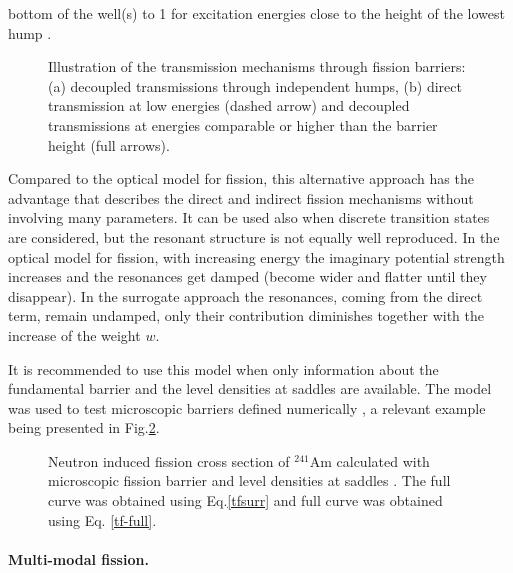 bottom of the well(s) to 1 for excitation energies close to the height of
the lowest hump \cite{Sin:07}. 
\begin{figure}[htbp]
\caption{Illustration of the transmission mechanisms through fission
barriers: (a) decoupled transmissions through independent humps, (b) direct
transmission at low energies (dashed arrow) and decoupled transmissions at
energies comparable or higher than the barrier height (full arrows).}
\label{fis-ld0.eps}
\end{figure}
Compared to the optical model for fission, this alternative approach has the
advantage that describes the direct and indirect fission mechanisms without
involving many parameters. It can be used also when discrete transition
states are considered, but the resonant structure is not equally well
reproduced. In the optical model for fission, with increasing energy the
imaginary potential strength increases and the resonances get damped (become
wider and flatter until they disappear). In the surrogate approach the
resonances, coming from the direct term, remain undamped, only their
contribution diminishes together with the increase of the weight $w$.

It is recommended to use this model when only information about the
fundamental barrier and the level densities at saddles are available. The
model was used to test microscopic barriers defined numerically \cite{Sin:07}%
, a relevant example being presented in Fig.\ref{am41-surr}. 
\begin{figure}[htbp]
\caption{Neutron induced fission cross section of $^{241}$Am calculated with
microscopic fission barrier \protect\cite{Goriely:07-mass} and level
densities at saddles \protect\cite{Goriely:07-ld}. The full curve was
obtained using Eq.\protect\ref{tfsurr} and full curve was obtained using Eq.%
\protect\ref{tf-full}.}
\label{am41-surr}
\end{figure}

\medskip %

\paragraph*{Multi-modal fission.}

